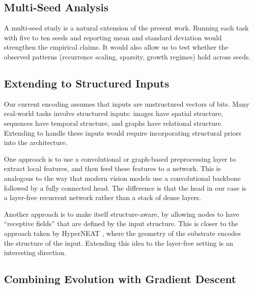 \subsection{Multi-Seed Analysis}
\label{sec:disc-future-seed}

A multi-seed study is a natural extension of the present work. Running
each task with five to ten seeds and reporting mean and standard
deviation would strengthen the empirical claims. It would also allow
us to test whether the observed patterns (recurrence scaling, sparsity,
growth regimes) hold across seeds.

\subsection{Extending to Structured Inputs}
\label{sec:disc-future-structured}

Our current encoding assumes that inputs are unstructured vectors of
bits. Many real-world tasks involve structured inputs: images have
spatial structure, sequences have temporal structure, and graphs have
relational structure. Extending \modnet{} to handle these inputs would
require incorporating structural priors into the architecture.

One approach is to use a convolutional or graph-based preprocessing
layer to extract local features, and then feed these features to a
\modnet{} network. This is analogous to the way that modern vision
models use a convolutional backbone followed by a fully connected head.
The difference is that the head in our case is a layer-free recurrent
network rather than a stack of dense layers.

Another approach is to make \modnet{} itself structure-aware, by
allowing nodes to have ``receptive fields'' that are defined by the
input structure. This is closer to the approach taken by HyperNEAT
\citep{stanley2009hypercube}, where the geometry of the substrate
encodes the structure of the input. Extending this idea to the
layer-free setting is an interesting direction.

\subsection{Combining Evolution with Gradient Descent}
\label{sec:disc-future-hybrid}

